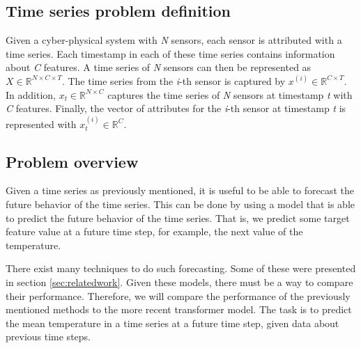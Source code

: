 \subsection{Time series problem definition}
Given a cyber-physical system with \textit{N} sensors, each sensor is attributed with a time series.
Each timestamp in each of these time series contains information about \textit{C} features.
A time series of \textit{N} sensors can then be represented as \(X \in \mathbb{R}^{N \times C \times T}\).
The time series from the \textit{i}-th sensor is captured by \(x^{(i)} \in \mathbb{R}^{C \times T} \).
In addition, \(x_{t} \in \mathbb{R}^{N \times C}\) captures the time series of \textit{N} sensors at timestamp \textit{t} with \textit{C} features.
Finally, the vector of attributes for the \textit{i}-th sensor at timestamp \textit{t} is represented with \(x_{t}^{(i)} \in \mathbb{R}^{C}\). \cite{cirsteaEnhanceNetPluginNeural2021}


\subsection{Problem overview}
Given a time series as previously mentioned, it is useful to be able to forecast the future behavior of the time series.
This can be done by using a model that is able to predict the future behavior of the time series.
That is, we predict some target feature value at a future time step, for example, the next value of the temperature.


There exist many techniques to do such forecasting. Some of these were presented in section \ref{sec:relatedwork}.
Given these models, there must be a way to compare their performance.
Therefore, we will compare the performance of the previously mentioned methods to the more recent transformer model.
The task is to predict the mean temperature in a time series at a future time step, given data about previous time steps.